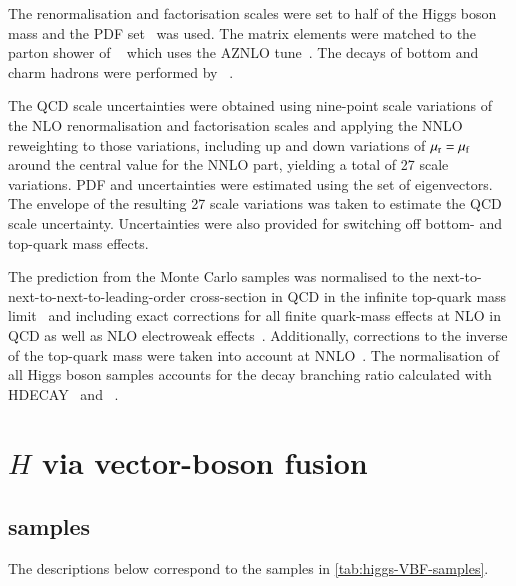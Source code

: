 The renormalisation and factorisation scales were set to half of the Higgs boson mass and the \PDFforLHC[15nnlo] PDF
set~\cite{Butterworth:2015oua} was used. The matrix elements were matched to the parton shower of \PYTHIA[8]~\cite{Sjostrand:2014zea}
which uses the AZNLO tune~\cite{STDM-2012-23}. The decays of bottom and charm hadrons
were performed by \EVTGEN~\cite{Lange:2001uf}.

The QCD scale uncertainties were obtained using nine-point scale variations of the NLO renormalisation and factorisation scales and applying the NNLO reweighting to those variations, including up and down variations of \(\mu_\mathrm{r}=\mu_\mathrm{f}\) around the central value for the NNLO part, yielding a total of 27 scale variations.
PDF and \alphas uncertainties were estimated using the \PDFforLHC[15nlo] set of eigenvectors.
The envelope of the resulting 27 scale variations was taken to estimate the QCD scale uncertainty.
Uncertainties were also provided for switching off bottom- and top-quark mass effects.

The prediction from the Monte Carlo samples was normalised to the next-to-next-to-next-to-leading-order
cross-section in QCD in the infinite top-quark mass
limit~\cite{deFlorian:2016spz,Anastasiou:2016cez,Anastasiou:2015ema,Dulat:2018rbf,Aglietti:2004nj} and including exact
corrections for all finite quark-mass effects at NLO in QCD as well as NLO electroweak
effects~\cite{Actis:2008ug,Bonetti:2018ukf}. Additionally, corrections to the inverse of the top-quark mass were taken
into account at NNLO~\cite{Harlander:2009mq,Harlander:2009bw,Harlander:2009my,Pak:2009dg}.
The normalisation of all Higgs boson samples accounts for the decay branching ratio calculated with
HDECAY~\cite{Djouadi:1997yw,Spira:1997dg,Djouadi:2006bz}
and \PROPHECY~\cite{Bredenstein:2006ha,Bredenstein:2006rh,Bredenstein:2006nk}.


\section{\(H\) via vector-boson fusion}

\subsection*{\texorpdfstring{\POWPY[8]}{Powheg+Pythia8} samples}

The descriptions below correspond to the samples in \cref{tab:higgs-VBF-samples}.

